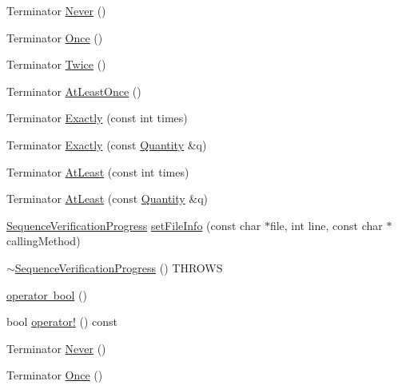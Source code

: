 \begin{DoxyCompactItemize}
\item 
Terminator \mbox{\hyperlink{classfakeit_1_1SequenceVerificationProgress_ad71678d34cb297945ecad2e1fe825f31}{Never}} ()
\item 
Terminator \mbox{\hyperlink{classfakeit_1_1SequenceVerificationProgress_a4a3260eb1380fcee1c0d8ae162ea57f4}{Once}} ()
\item 
Terminator \mbox{\hyperlink{classfakeit_1_1SequenceVerificationProgress_ac453e14db60c17c23748cc5f4f2325ca}{Twice}} ()
\item 
Terminator \mbox{\hyperlink{classfakeit_1_1SequenceVerificationProgress_a682eed8897bda26aa2927f0a0b03f0b1}{At\+Least\+Once}} ()
\item 
Terminator \mbox{\hyperlink{classfakeit_1_1SequenceVerificationProgress_a74c04958c69e3c977ce873de3787305d}{Exactly}} (const int times)
\item 
Terminator \mbox{\hyperlink{classfakeit_1_1SequenceVerificationProgress_abb39ac5b5e16e07b1caaf01325228c47}{Exactly}} (const \mbox{\hyperlink{structfakeit_1_1Quantity}{Quantity}} \&q)
\item 
Terminator \mbox{\hyperlink{classfakeit_1_1SequenceVerificationProgress_a83ba8d481bb79dad783f9bc821dd650e}{At\+Least}} (const int times)
\item 
Terminator \mbox{\hyperlink{classfakeit_1_1SequenceVerificationProgress_a1f6e949249d3f8119e920f6df6f7ade2}{At\+Least}} (const \mbox{\hyperlink{structfakeit_1_1Quantity}{Quantity}} \&q)
\item 
\mbox{\hyperlink{classfakeit_1_1SequenceVerificationProgress}{Sequence\+Verification\+Progress}} \mbox{\hyperlink{classfakeit_1_1SequenceVerificationProgress_aeeadb72fd4e0f52c06fa28c6b54d8188}{set\+File\+Info}} (const char $\ast$file, int line, const char $\ast$calling\+Method)
\item 
\mbox{\hyperlink{classfakeit_1_1SequenceVerificationProgress_a2c3325aa3d50002ef448d31e21494f76}{$\sim$\+Sequence\+Verification\+Progress}} () T\+H\+R\+O\+WS
\item 
\mbox{\hyperlink{classfakeit_1_1SequenceVerificationProgress_a462f6bec1f00814e918f9be6bd5f84e6}{operator bool}} ()
\item 
bool \mbox{\hyperlink{classfakeit_1_1SequenceVerificationProgress_a43f9268650854f97cbae3b28487c2be0}{operator!}} () const
\item 
Terminator \mbox{\hyperlink{classfakeit_1_1SequenceVerificationProgress_ad71678d34cb297945ecad2e1fe825f31}{Never}} ()
\item 
Terminator \mbox{\hyperlink{classfakeit_1_1SequenceVerificationProgress_a4a3260eb1380fcee1c0d8ae162ea57f4}{Once}} ()

\end{DoxyCompactItemize}
